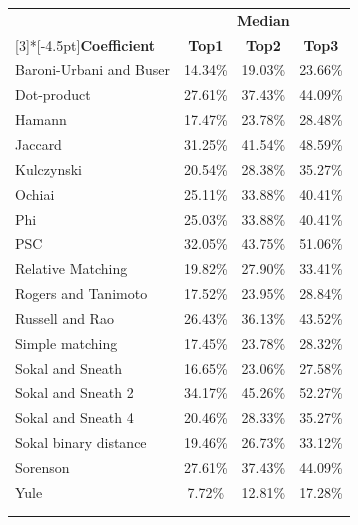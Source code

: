 \documentclass[smallextended,natbib]{svjour3}
\begin{document}
{\begin{table}[tbp]
\begin{tabular}{lccc}
    \rowcolor{gray!50}\multicolumn{4}{c}{\textbf{MOVE METHOD}} \\
    \hline
    \rowcolor{gray!25} & \multicolumn{3}{c}{\textbf{Median}} \\
     \rowcolor{gray!25} \multirow{-2}[3]{*}[-4.5pt]{\textbf{Coefficient}}    & \multicolumn{1}{c}{\textbf{Top1}} & \multicolumn{1}{c}{\textbf{Top2}} & \textbf{Top3} \\
    Baroni-Urbani and Buser & 14.34\% & 19.03\% & 23.66\% \\[-0.0110cm]
    \rowcolor{gray!15}Dot-product & 27.61\% & 37.43\% & 44.09\% \\[-0.0110cm]
    Hamann & 17.47\% & 23.78\% & 28.48\% \\[-0.0110cm]
    \rowcolor{gray!15}Jaccard & 31.25\% & 41.54\% & 48.59\% \\[-0.0110cm]
    Kulczynski & 20.54\% & 28.38\% & 35.27\% \\[-0.0110cm]
    \rowcolor{gray!15}Ochiai & 25.11\% & 33.88\% & 40.41\% \\[-0.0110cm]
    Phi & 25.03\% & 33.88\% & 40.41\% \\[-0.0110cm]
    \rowcolor{gray!15}PSC & 32.05\% & 43.75\% & 51.06\% \\[-0.0110cm]
    Relative Matching & 19.82\% & 27.90\% & 33.41\% \\[-0.0110cm]
    \rowcolor{gray!15}Rogers and Tanimoto & 17.52\% & 23.95\% & 28.84\% \\[-0.0110cm]
    Russell and Rao & 26.43\% & 36.13\% & 43.52\% \\[-0.0110cm]
    \rowcolor{gray!15}Simple matching & 17.45\% & 23.78\% & 28.32\% \\[-0.0110cm]
    Sokal and Sneath & 16.65\% & 23.06\% & 27.58\% \\[-0.0110cm]
    \rowcolor{mycolor}Sokal and Sneath 2 & 34.17\% & 45.26\% & 52.27\% \\[-0.0110cm]
    Sokal and Sneath 4 & 20.46\% & 28.33\% & 35.27\% \\[-0.0110cm]
    \rowcolor{gray!15}Sokal binary distance & 19.46\% & 26.73\% & 33.12\% \\[-0.0110cm]
     Sorenson & 27.61\% & 37.43\% & 44.09\% \\[-0.0110cm]
     \rowcolor{gray!15}Yule & 7.72\% & 12.81\% & 17.28\% \\[-0.0110cm]
    \hline
     \multicolumn{4}{c}{} \\    \hline
    \rowcolor{gray!50} \multicolumn{4}{c}{\textbf{EXTRACT METHOD}} \\

\end{tabular}
\end{table}}
\end{document}
